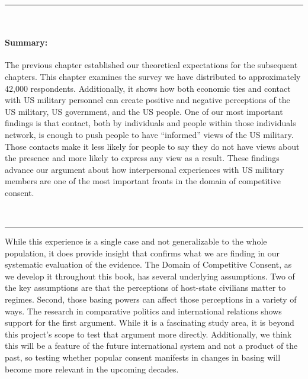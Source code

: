 


\vspace*{-0.5cm}
\rule{\linewidth}{0.10pt} \\[-1cm]
{\footnotesize\paragraph{Summary:}  The previous chapter established our theoretical expectations for the subsequent chapters. This chapter examines the survey we have distributed to approximately 42,000 respondents. Additionally, it shows how both economic ties and contact with US military personnel can create positive and negative perceptions of the US military, US government, and the US people. One of our most important findings is that contact, both by individuals and people within those individuals network, is enough to push people to have ``informed'' views of the US military. Those contacts make it less likely for people to say they do not have views about the presence and more likely to express any view as a result. These findings advance our argument about how interpersonal experiences with US military members are one of the most important fronts in the domain of competitive consent.} 
\\[-0.5cm] 
\rule{\linewidth}{0.10pt}

\vspace*{0.5cm}


While this experience is a single case and not generalizable to the whole population, it does provide insight that confirms what we are finding in our systematic evaluation of the evidence. The Domain of Competitive Consent, as we develop it throughout this book, has several underlying assumptions. Two of the key assumptions are that the perceptions of host-state civilians matter to regimes. Second, those basing powers can affect those perceptions in a variety of ways. The research in comparative politics and international relations shows support for the first argument. While it is a fascinating study area, it is beyond this project's scope to test that argument more directly. Additionally, we think this will be a feature of the future international system and not a product of the past, so testing whether popular consent manifests in changes in basing will become more relevant in the upcoming decades. 

